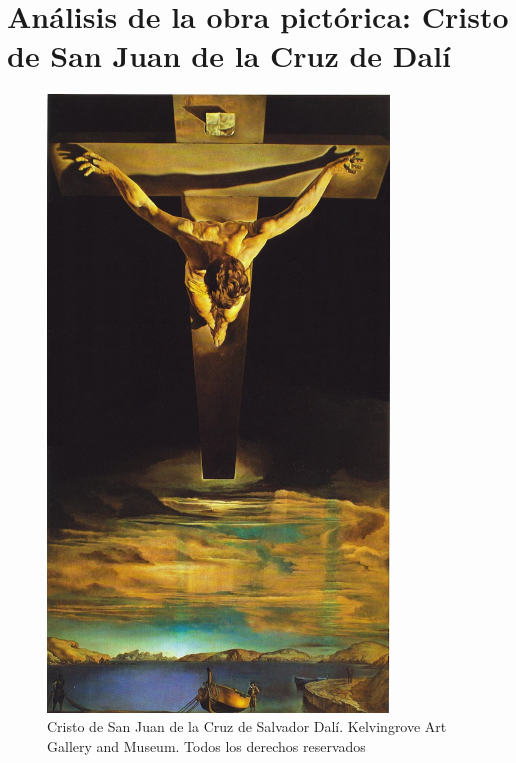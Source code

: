 \section{Análisis de la obra pictórica: Cristo de San Juan de la Cruz de Dalí}
\begin{figure}[ht!]
    \centering
    \includegraphics[width=0.81\textwidth]{dali.jpg}
    \caption{Cristo de San Juan de la Cruz de Salvador Dalí. Kelvingrove Art Gallery and Museum. Todos los derechos reservados} %
\end{figure}
\newpage



